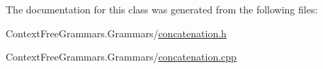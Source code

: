 The documentation for this class was generated from the following files\+:\begin{DoxyCompactItemize}
\item 
Context\+Free\+Grammars.\+Grammars/\mbox{\hyperlink{concatenation_8h}{concatenation.\+h}}\item 
Context\+Free\+Grammars.\+Grammars/\mbox{\hyperlink{concatenation_8cpp}{concatenation.\+cpp}}\end{DoxyCompactItemize}
